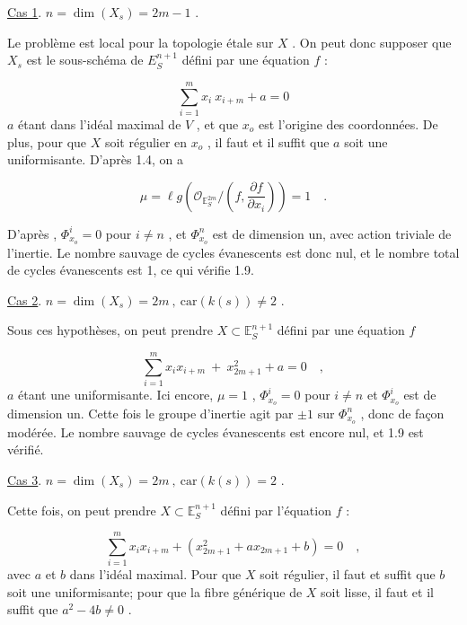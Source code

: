 \underline{Cas 1}. \quad \underline{$n = \dim(X_s) = 2m - 1$} .

Le problème est local pour la topologie étale sur $X$ . On peut donc supposer que $X_s$ est le sous-schéma de $E_S^{n+1}$ défini par une équation $f$ :

\begin{equation*}
\sum_{i=1}^{m} x_i \ x_{i+m} + a = 0
\end{equation*}
$a$ étant dans l'idéal maximal de $V$ , et que $x_o$ est l'origine des coordonnées. De plus, pour que $X$ soit régulier en $x_o$ , il faut et il suffit que $a$ soit une uniformisante. D'après 1.4, on a

\begin{equation*}
\mu = \ell g(\mathcal{O}_{\mathbb{E}_S^{2m}} / (f, \frac{\partial f}{\partial x_i})) = 1 \quad .
\end{equation*}


D'après \hspace{2.5cm} , $\Phi^i_{x_o} = 0$ pour $i \neq n$ , et $\Phi^n_{x_o}$ est de dimension un, avec action triviale de l'inertie. Le nombre sauvage de cycles évanescents est donc nul, et le nombre total de cycles évanescents est 1, ce qui vérifie 1.9.

\underline{Cas 2}. \quad \underline{$n = \dim(X_s) = 2m \ , \ \mathrm{car}(k(s)) \neq 2$} .

Sous ces hypothèses, on peut prendre $X \subset \mathbb{E}_S^{n+1}$ défini par une équation $f$

\begin{equation*}
\sum_{i=1}^{m} x_ix_{i+m} \ + \ x_{2m+1}^2 + a = 0 \quad ,
\end{equation*}
$a$ étant une uniformisante. Ici encore, $\mu = 1$ , $\Phi^i_{x_o} = 0$ pour $i \neq n$ et $\Phi^i_{x_o}$ est de dimension un. Cette fois le groupe d'inertie agit par $\pm 1$ sur $\Phi^n_{x_o}$ , donc de façon modérée. Le nombre sauvage de cycles évanescents est encore nul, et 1.9 est vérifié.

\underline{Cas 3}. \quad \underline{$n = \dim(X_s) = 2m \ , \ \mathrm{car}(k(s)) = 2$} .

Cette fois, on peut prendre $X \subset \mathbb{E}_S^{n+1}$ défini par l'équation $f$ :

\begin{equation*}
\sum_{i=1}^{m} x_ix_{i+m} + (x_{2m+1}^2 + ax_{2m+1} + b) = 0 \quad ,
\end{equation*}
avec $a$ et $b$ dans l'idéal maximal. Pour que $X$ soit régulier, il faut et suffit que $b$ soit une uniformisante; pour que la fibre générique de $X$ soit lisse, il faut et il suffit que $a^2 - 4b \neq 0$ .

